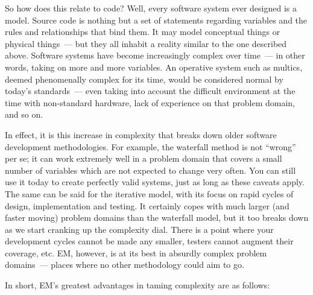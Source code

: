 \documentclass{book}
\begin{document}
So how does this relate to code? Well, every software system ever
designed is a model. Source code is nothing but a set of statements
regarding variables and the rules and relationships that bind them. It
may model conceptual things or physical things~--- but they all
inhabit a reality similar to the one described above. Software systems
have become increasingly complex over time~--- in other words, taking
on more and more variables. An operative system such as multics,
deemed phenomenally complex for its time, would be considered normal
by today's standards~--- even taking into account the difficult
environment at the time with non-standard hardware, lack of experience
on that problem domain, and so on.

In effect, it is this increase in complexity that breaks down older
software development methodologies. For example, the waterfall method
is not ``wrong'' per se; it can work extremely well in a problem
domain that covers a small number of variables which are not expected
to change very often. You can still use it today to create perfectly
valid systems, just as long as these caveats apply. The same can be
said for the iterative model, with its focus on rapid cycles of
design, implementation and testing. It certainly copes with much
larger (and faster moving) problem domains than the waterfall model,
but it too breaks down as we start cranking up the complexity
dial. There is a point where your development cycles cannot be made
any smaller, testers cannot augment their coverage, etc. EM, however,
is at its best in absurdly complex problem domains~--- places where
no other methodology could aim to go.

In short, EM's greatest advantages in taming complexity are as
follows:
\end{document}
